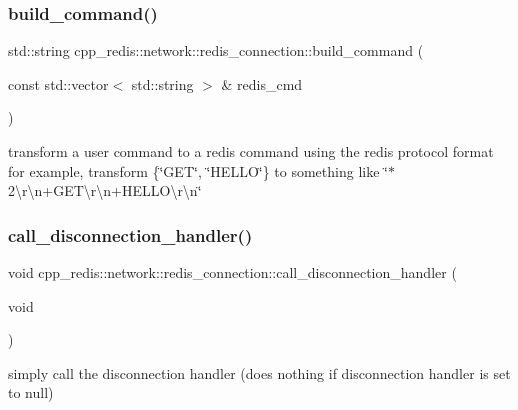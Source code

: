 \subsubsection{\texorpdfstring{build\+\_\+command()}{build\_command()}}
{\footnotesize\ttfamily std\+::string cpp\+\_\+redis\+::network\+::redis\+\_\+connection\+::build\+\_\+command (\begin{DoxyParamCaption}\item[{const std\+::vector$<$ std\+::string $>$ \&}]{redis\+\_\+cmd }\end{DoxyParamCaption})\hspace{0.3cm}{\ttfamily [private]}}

transform a user command to a redis command using the redis protocol format for example, transform \{\char`\"{}\+G\+E\+T\char`\"{}, \char`\"{}\+H\+E\+L\+L\+O\char`\"{}\} to something like \char`\"{}$\ast$2\textbackslash{}r\textbackslash{}n+\+G\+E\+T\textbackslash{}r\textbackslash{}n+\+H\+E\+L\+L\+O\textbackslash{}r\textbackslash{}n\char`\"{} \mbox{\label{classcpp__redis_1_1network_1_1redis__connection_a257a6eca9660be3ede989143da38d25b}} 
\subsubsection{\texorpdfstring{call\+\_\+disconnection\+\_\+handler()}{call\_disconnection\_handler()}}
{\footnotesize\ttfamily void cpp\+\_\+redis\+::network\+::redis\+\_\+connection\+::call\+\_\+disconnection\+\_\+handler (\begin{DoxyParamCaption}\item[{void}]{ }\end{DoxyParamCaption})\hspace{0.3cm}{\ttfamily [private]}}

simply call the disconnection handler (does nothing if disconnection handler is set to null) \mbox{\label{classcpp__redis_1_1network_1_1redis__connection_a8e6980d40139877c16e995051b780d60}} 
